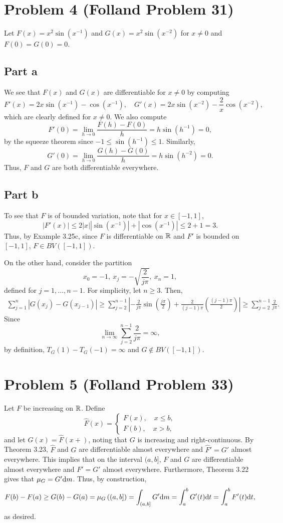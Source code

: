 \documentclass{article}
\begin{document}
\section{Problem 4 (Folland Problem 31)}
Let $F(x)=x^2\sin(x^{-1})$ and $G(x)=x^2\sin(x^{-2})$ for $x\neq0$ and $F(0)=G(0)=0$. 
\subsection{Part a}
We see that $F(x)$ and $G(x)$ are differentiable for $x\neq0$ by computing
\[
F'(x)=2x\sin(x^{-1})-\cos(x^{-1}),\quad G'(x)=2x\sin(x^{-2})-\frac{2}{x}\cos(x^{-2}),
\]
which are clearly defined for $x\neq0$. We also compute
\[
F'(0)=\lim_{h\to0}\frac{F(h)-F(0)}{h}=h\sin(h^{-1})=0,
\]
by the squeeze theorem since $-1\leq\sin(h^{-1})\leq1$. Similarly,
\[
G'(0)=\lim_{h\to0}\frac{G(h)-G(0)}{h}=h\sin(h^{-2})=0.
\]
Thus, $F$ and $G$ are both differentiable everywhere.

\subsection{Part b}
To see that $F$ is of bounded variation, note that for $x\in[-1,1]$,
\[
|F'(x)|\leq 2|x|\left|\sin(x^{-1})\right|+\left|\cos(x^{-1})\right|\leq2+1=3.
\]
Thus, by Example 3.25c, since $F$ is differentiable on $\mathbb{R}$ and $F'$ is bounded on $[-1,1]$, $F\in BV([-1,1])$.

On the other hand, consider the partition 
\[
x_0=-1,~x_j=-\sqrt{\frac{2}{j\pi}},~x_n=1,
\]
defined for $j=1,\ldots,n-1$. For simplicity, let $n\geq3$. Then,
\begin{align*}
\sum_{j=1}^n\left|G(x_j)-G(x_{j-1})\right|\geq \sum_{j=2}^{n-1}\left|-\frac{2}{j\pi}\sin\left(\frac{j\pi}{2}\right)+\frac{2}{(j-1)\pi}\left(\frac{(j-1)\pi}{2}\right)\right|\geq\sum_{j=2}^{n-1}\frac{2}{j\pi}.
\end{align*}
Since
\[
\lim_{n\to\infty}\sum_{j=2}^{n-1}\frac{2}{j\pi}=\infty,
\]
by definition, $T_G(1)-T_G(-1)=\infty$ and $G\notin BV([-1,1])$.

\section{Problem 5 (Folland Problem 33)}
Let $F$ be increasing on $\mathbb{R}$. Define 
\[
\hat F(x)=\begin{cases}
	F(x),\quad x\leq b,\\
	F(b),\quad x>b,
\end{cases}
\]
and let $G(x)=\hat F(x+)$, noting that $G$ is increasing and right-continuous. By Theorem 3.23, $\hat F$ and $G$ are differentiable almost everywhere and $\hat F'=G'$ almost everywhere. This implies that on the interval $(a,b]$, $F$ and $G$ are differentiable almost everywhere and $F'=G'$ almost everywhere. Furthermore, Theorem 3.22 gives that $\mu_G=G'\mathrm{d} m$. Thus, by construction,
\begin{align*}
F(b)-F(a)\geq G(b)-G(a)=\mu_G\left((a,b]\right)=\int_{(a,b]}G'\mathrm{d} m=\int_a^bG'(t)\mathrm{d} t=\int_a^bF'(t)\mathrm{d} t,
\end{align*}
as desired. 
\end{document}
